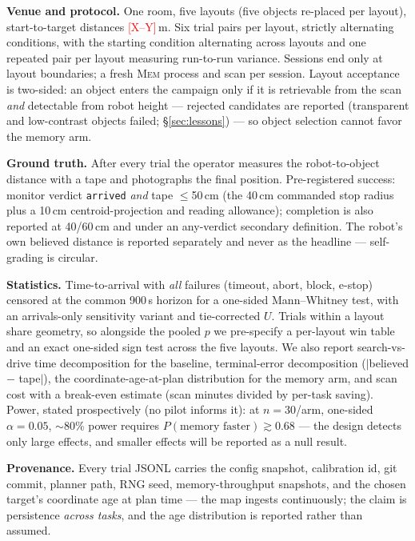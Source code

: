 \documentclass{article}
\newcommand{\todo}[1]{\textcolor{red}{[#1]}}
\newcommand{\rtsm}{\textsc{Mem}} %
\begin{document}
\textbf{Venue and protocol.} One room, five layouts (five objects
re-placed per layout), start-to-target distances \todo{X--Y}\,m. Six
trial pairs per layout, strictly alternating conditions, with the
starting condition alternating across layouts and one repeated pair per
layout measuring run-to-run variance. Sessions end only at layout
boundaries; a fresh \rtsm{} process and scan per session. Layout
acceptance is two-sided: an object enters the campaign only if it is
retrievable from the scan \emph{and} detectable from robot height ---
rejected candidates are reported (transparent and low-contrast objects
failed; \S\ref{sec:lessons}) --- so object selection cannot favor the
memory arm.

\textbf{Ground truth.} After every trial the operator measures the
robot-to-object distance with a tape and photographs the final
position. Pre-registered success: monitor verdict \texttt{arrived}
\emph{and} tape $\leq$50\,cm (the 40\,cm commanded stop radius plus a
10\,cm centroid-projection and reading allowance); completion is also
reported at 40/60\,cm and under an any-verdict secondary definition.
The robot's own believed distance is reported separately and never as
the headline --- self-grading is circular.

\textbf{Statistics.} Time-to-arrival with \emph{all} failures (timeout,
abort, block, e-stop) censored at the common 900\,s horizon for a
one-sided Mann--Whitney test, with an arrivals-only sensitivity variant
and tie-corrected $U$. Trials within a layout share geometry, so
alongside the pooled $p$ we pre-specify a per-layout win table and an
exact one-sided sign test across the five layouts. We also report
search-vs-drive time decomposition for the baseline, terminal-error
decomposition ($|$believed $-$ tape$|$), the coordinate-age-at-plan
distribution for the memory arm, and scan cost with a break-even
estimate (scan minutes divided by per-task saving). Power, stated
prospectively (no pilot informs it): at $n=30$/arm, one-sided
$\alpha=0.05$, $\sim$80\% power requires $P(\text{memory faster})
\gtrsim 0.68$ --- the design detects only large effects, and smaller
effects will be reported as a null result.

\textbf{Provenance.} Every trial JSONL carries the config snapshot,
calibration id, git commit, planner path, RNG seed, memory-throughput
snapshots, and the chosen target's coordinate age at plan time --- the
map ingests continuously; the claim is persistence \emph{across tasks},
and the age distribution is reported rather than assumed.
\end{document}
